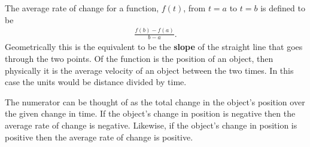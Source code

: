 The average rate of change for a function, $f(t)$, from $t=a$ to $t=b$ is
defined to be 
\begin{eqnarray*}
  \frac{f(b)-f(a)}{b-a}.
\end{eqnarray*}
Geometrically this is the equivalent to be the \textbf{slope} of the
straight line that goes through the two points. Of the function is the
position of an object, then physically it is the average velocity of
an object between the two times. In this case the units would be
distance divided by time.

\scalebox{0.5}{}

The numerator can be thought of as the total change in the object's
position over the given change in time. If the object's change in
position is negative then the average rate of change is
negative. Likewise, if the object's change in position is positive
then the average rate of change is positive.

\clearpage

